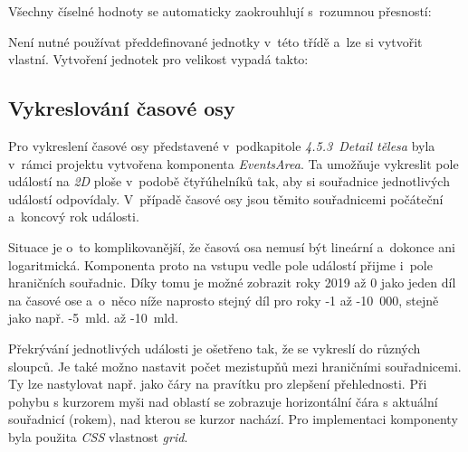 \documentclass[a4paper,12pt]{article}
\begin{document}


Všechny číselné hodnoty se automaticky zaokrouhlují s~rozumnou přesností:



Není nutné používat předdefinované jednotky v~této třídě a~lze si vytvořit vlastní. Vytvoření jednotek pro velikost vypadá takto:



\vspace*{-0.5cm}
\subsection{Vykreslování časové osy}

Pro vykreslení časové osy představené v~podkapitole \textit{4.5.3~Detail tělesa} byla v~rámci projektu vytvořena komponenta \textit{EventsArea}. Ta umožňuje vykreslit pole událostí na \textit{2D} ploše v~podobě čtyřúhelníků tak, aby si souřadnice jednotlivých událostí odpovídaly. V~případě časové osy jsou těmito souřadnicemi počáteční a~koncový rok události.

Situace je o~to komplikovanější, že časová osa nemusí být lineární a~dokonce ani logaritmická. Komponenta proto na vstupu vedle pole událostí přijme i~pole hraničních souřadnic. Díky tomu je možné zobrazit roky 2019 až 0 jako jeden díl na časové ose a~o~něco níže naprosto stejný díl pro roky -1 až -10~000, stejně jako např. -5~mld. až -10~mld.

Překrývání jednotlivých události je ošetřeno tak, že se vykreslí do různých sloupců. Je také možno nastavit počet mezistupňů mezi hraničními souřadnicemi. Ty lze nastylovat např. jako čáry na pravítku pro zlepšení přehlednosti. Při pohybu s kurzorem myši nad oblastí se zobrazuje horizontální čára s aktuální souřadnicí (rokem), nad kterou se kurzor nachází. Pro implementaci komponenty byla použita \textit{CSS} vlastnost \textit{grid}.




\end{document}
